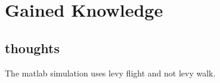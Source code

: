 \chapter{Gained Knowledge}

\section{thoughts}
The matlab simulation uses levy flight and not levy walk.